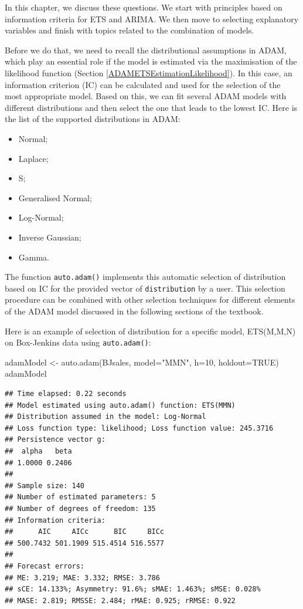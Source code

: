 \documentclass[
]{book}
\newenvironment{Shaded}{\begin{snugshade}}{\end{snugshade}}
\newcommand{\AttributeTok}[1]{\textcolor[rgb]{0.77,0.63,0.00}{#1}}
\newcommand{\ConstantTok}[1]{\textcolor[rgb]{0.00,0.00,0.00}{#1}}
\newcommand{\DecValTok}[1]{\textcolor[rgb]{0.00,0.00,0.81}{#1}}
\newcommand{\FunctionTok}[1]{\textcolor[rgb]{0.00,0.00,0.00}{#1}}
\newcommand{\NormalTok}[1]{#1}
\newcommand{\OtherTok}[1]{\textcolor[rgb]{0.56,0.35,0.01}{#1}}
\newcommand{\StringTok}[1]{\textcolor[rgb]{0.31,0.60,0.02}{#1}}
\providecommand{\tightlist}{%
  \setlength{\itemsep}{0pt}\setlength{\parskip}{0pt}}
\theoremstyle{definition}
\theoremstyle{definition}
\theoremstyle{definition}
\theoremstyle{definition}
\theoremstyle{remark}
\begin{document}
In this chapter, we discuss these questions. We start with principles based on information criteria \citep[addressed in Chapter 13 of][]{SvetunkovSBA} for ETS and ARIMA. We then move to selecting explanatory variables and finish with topics related to the combination of models.

Before we do that, we need to recall the distributional assumptions in ADAM, which play an essential role if the model is estimated via the maximisation of the likelihood function (Section \ref{ADAMETSEstimationLikelihood}). In this case, an information criterion (IC) can be calculated and used for the selection of the most appropriate model. Based on this, we can fit several ADAM models with different distributions and then select the one that leads to the lowest IC. Here is the list of the supported distributions in ADAM:

\begin{itemize}
\tightlist
\item
  Normal;
\item
  Laplace;
\item
  S;
\item
  Generalised Normal;
\item
  Log-Normal;
\item
  Inverse Gaussian;
\item
  Gamma.
\end{itemize}

The function \texttt{auto.adam()} implements this automatic selection of distribution based on IC for the provided vector of \texttt{distribution} by a user. This selection procedure can be combined with other selection techniques for different elements of the ADAM model discussed in the following sections of the textbook.

Here is an example of selection of distribution for a specific model, ETS(M,M,N) on Box-Jenkins data using \texttt{auto.adam()}:

\begin{Shaded}
\begin{Highlighting}[]
\NormalTok{adamModel }\OtherTok{\textless{}{-}} \FunctionTok{auto.adam}\NormalTok{(BJsales, }\AttributeTok{model=}\StringTok{"MMN"}\NormalTok{, }\AttributeTok{h=}\DecValTok{10}\NormalTok{, }\AttributeTok{holdout=}\ConstantTok{TRUE}\NormalTok{)}
\NormalTok{adamModel}
\end{Highlighting}
\end{Shaded}

\begin{verbatim}
## Time elapsed: 0.22 seconds
## Model estimated using auto.adam() function: ETS(MMN)
## Distribution assumed in the model: Log-Normal
## Loss function type: likelihood; Loss function value: 245.3716
## Persistence vector g:
##  alpha   beta 
## 1.0000 0.2406 
## 
## Sample size: 140
## Number of estimated parameters: 5
## Number of degrees of freedom: 135
## Information criteria:
##      AIC     AICc      BIC     BICc 
## 500.7432 501.1909 515.4514 516.5577 
## 
## Forecast errors:
## ME: 3.219; MAE: 3.332; RMSE: 3.786
## sCE: 14.133%; Asymmetry: 91.6%; sMAE: 1.463%; sMSE: 0.028%
## MASE: 2.819; RMSSE: 2.484; rMAE: 0.925; rRMSE: 0.922
\end{verbatim}
\end{document}
